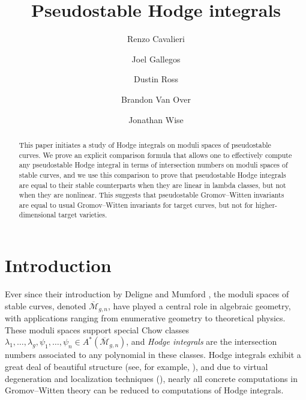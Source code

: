 \documentclass[12pt]{amsart}
\newcounter{intro}[section]
\theoremstyle{definition}
\newcommand{\M}{\overline{\mathcal{M}}}
\numberwithin{equation}{section}
\begin{document}
\title{Pseudostable Hodge integrals}
\author[R.~Cavalieri]{Renzo Cavalieri}
\address{Department of Mathematics, Colorado State University}

\author[J.~Gallegos]{Joel Gallegos}
\address{Department of Mathematics, University of Minneapolis}

\author[D.~Ross]{Dustin Ross}
\address{Department of Mathematics, San Francisco State University}

\author[B.~Van Over]{Brandon Van Over}
\address{Department of Mathematics, Colorado State University }

\author[J.~Wise]{Jonathan Wise}
\address{Department of Mathematics,  University of Colorado}

\begin{abstract}
This paper initiates a study of Hodge integrals on moduli spaces of pseudostable curves. We prove an explicit comparison formula that allows one to effectively compute any pseudostable Hodge integral in terms of intersection numbers on moduli spaces of stable curves, and we use this comparison to prove that pseudostable Hodge integrals are equal to their stable counterparts when they are linear in lambda classes, but not when they are nonlinear. This suggests that pseudostable Gromov--Witten invariants are equal to usual Gromov--Witten invariants for target curves, but not for higher-dimensional target varieties.
\end{abstract}

\maketitle

\section{Introduction}

Ever since their introduction by Deligne and Mumford \cite{DeligneMumford}, the moduli spaces of stable curves, denoted $\M_{g,n}$, have played a central role in algebraic geometry, with applications ranging from enumerative geometry to theoretical physics. These moduli spaces support special Chow classes $\lambda_1,\dots,\lambda_g,\psi_1,\dots,\psi_n\in A^*(\M_{g,n})$, and \emph{Hodge integrals} are the intersection numbers associated to any polynomial in these classes. Hodge integrals exhibit a great deal of beautiful structure (see, for example, \cite{FP}), and due to virtual degeneration and localization techniques (\cite{BehrendFantechi,Li,GraberPandharipande}), nearly all concrete computations in Gromov--Witten theory can be reduced to computations of Hodge integrals.
\end{document}
